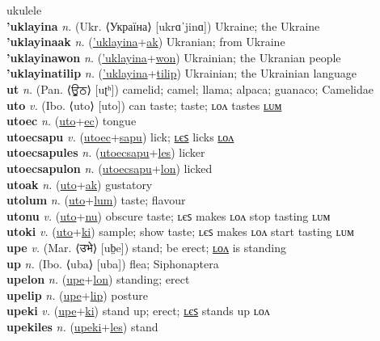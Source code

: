 ukulele \label{'ukulele} \\
\textbf{'uklayina} \textit{n.} (Ukr. ⟨Україна⟩ [ukrɑˈjinɑ])
Ukraine; the Ukraine \label{'uklayina} \\
\textbf{'uklayinaak} \textit{n.} (\hyperref['uklayina]{'uklayina}+\hyperref[ak]{ak})
Ukranian; from Ukraine \label{'uklayinaak} \\
\textbf{'uklayinawon} \textit{n.} (\hyperref['uklayina]{'uklayina}+\hyperref[won]{won})
Ukrainian; the Ukranian people \label{'uklayinawon} \\
\textbf{'uklayinatilip} \textit{n.} (\hyperref['uklayina]{'uklayina}+\hyperref[tilip]{tilip})
Ukrainian; the Ukrainian language \label{'uklayinatilip} \\
\textbf{ut} \textit{n.} (Pan. ⟨ਊਠ⟩ [uʈʰ])
camelid; camel; llama; alpaca; guanaco; Camelidae \label{ut} \\
\textbf{uto} \textit{v.} (Ibo. ⟨uto⟩ [uto])
can taste; taste; ʟᴏᴧ tastes \hyperref[utolum]{ʟᴜᴍ} \label{uto} \\
\textbf{utoec} \textit{n.} (\hyperref[uto]{uto}+\hyperref[ec]{ec})
tongue \label{utoec} \\
\textbf{utoecsapu} \textit{v.} (\hyperref[utoec]{utoec}+\hyperref[sapu]{sapu})
lick; \hyperref[utoecsapules]{ʟєꜱ} licks \hyperref[utoecsapulon]{ʟᴏᴧ} \label{utoecsapu} \\
\textbf{utoecsapules} \textit{n.} (\hyperref[utoecsapu]{utoecsapu}+\hyperref[les]{les})
licker \label{utoecsapules} \\
\textbf{utoecsapulon} \textit{n.} (\hyperref[utoecsapu]{utoecsapu}+\hyperref[lon]{lon})
licked \label{utoecsapulon} \\
\textbf{utoak} \textit{n.} (\hyperref[uto]{uto}+\hyperref[ak]{ak})
gustatory \label{utoak} \\
\textbf{utolum} \textit{n.} (\hyperref[uto]{uto}+\hyperref[lum]{lum})
taste; flavour \label{utolum} \\
\textbf{utonu} \textit{v.} (\hyperref[uto]{uto}+\hyperref[nu]{nu})
obscure taste; ʟєꜱ makes ʟᴏᴧ stop tasting ʟᴜᴍ \label{utonu} \\
\textbf{utoki} \textit{v.} (\hyperref[uto]{uto}+\hyperref[ki]{ki})
sample; show taste; ʟєꜱ makes ʟᴏᴧ start tasting ʟᴜᴍ \label{utoki} \\
\textbf{upe} \textit{v.} (Mar. ⟨उभे⟩ [ub̤e])
stand; be erect; \hyperref[upelon]{ʟᴏᴧ} is standing \label{upe} \\
\textbf{up} \textit{n.} (Ibo. ⟨uba⟩ [uba])
flea; Siphonaptera \label{up} \\
\textbf{upelon} \textit{n.} (\hyperref[upe]{upe}+\hyperref[lon]{lon})
standing; erect \label{upelon} \\
\textbf{upelip} \textit{n.} (\hyperref[upe]{upe}+\hyperref[lip]{lip})
posture \label{upelip} \\
\textbf{upeki} \textit{v.} (\hyperref[upe]{upe}+\hyperref[ki]{ki})
stand up; erect; \hyperref[upekiles]{ʟєꜱ} stands up ʟᴏᴧ \label{upeki} \\
\textbf{upekiles} \textit{n.} (\hyperref[upeki]{upeki}+\hyperref[les]{les})
stand \label{upekiles} \\
